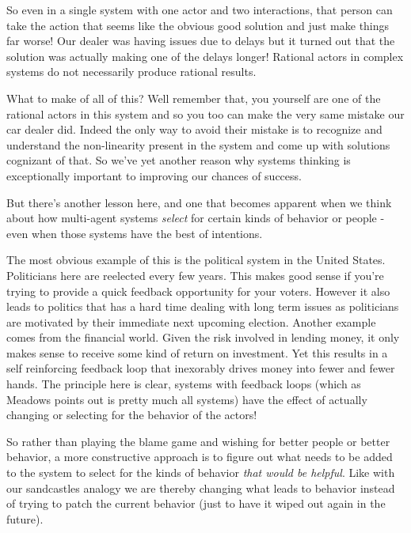 \documentclass[11pt,a5paper]{book}
\begin{document}
So even in a single system with one actor and two interactions, that person can take the action that seems like the obvious good solution and just make things far worse! Our dealer was having issues due to delays but it turned out that the solution was actually making one of the delays longer! Rational actors in complex systems do not necessarily produce rational results. 
\newline

What to make of all of this? Well remember that, you yourself are one of the rational actors in this system and so you too can make the very same mistake our car dealer did. Indeed the only way to avoid their mistake is to recognize and understand the non-linearity present in the system and come up with solutions cognizant of that. So we've yet another reason why systems thinking is exceptionally important to improving our chances of success.
\newline

But there's another lesson here, and one that becomes apparent when we think about how multi-agent systems \textit{select} for certain kinds of behavior or people - even when those systems have the best of intentions.
\newline

The most obvious example of this is the political system in the United States. Politicians here are reelected every few years. This makes good sense if you're trying to provide a quick feedback opportunity for your voters. However it also leads to politics that has a hard time dealing with long term issues as politicians are motivated by their immediate next upcoming election. Another example comes from the financial world. Given the risk involved in lending money, it only makes sense to receive some kind of return on investment. Yet this results in a self reinforcing feedback loop that inexorably drives money into fewer and fewer hands. The principle here is clear, systems with feedback loops (which as Meadows points out is pretty much all systems) have the effect of actually changing or selecting for the behavior of the actors!
\newline

So rather than playing the blame game and wishing for better people or better behavior, a more constructive approach is to figure out what needs to be added to the system to select for the kinds of behavior \textit{that would be helpful}. Like with our sandcastles analogy we are thereby changing what leads to behavior instead of trying to patch the current behavior (just to have it wiped out again in the future). 
\newline
\end{document}
